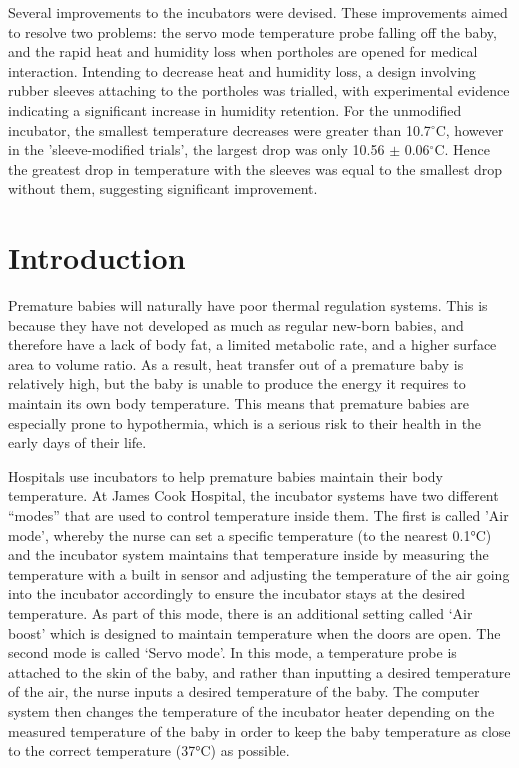 \documentclass{article}
\begin{document}
 \vspace{3mm}

Several improvements to the incubators were devised. These improvements aimed to resolve two problems: the servo mode temperature probe falling off the baby, and the rapid heat and humidity loss when portholes are opened for medical interaction. Intending to decrease heat and humidity loss, a design involving rubber sleeves attaching to the portholes was trialled, with experimental evidence indicating a significant increase in humidity retention. For the unmodified incubator, the smallest temperature decreases were greater than 10.7$^{\circ}$C, however in the 'sleeve-modified trials’, the largest drop was only 10.56 $\pm$ 0.06$^{\circ}$C. Hence the greatest drop in temperature with the sleeves was equal to the smallest drop without them, suggesting significant improvement. 

\section{Introduction}

Premature babies will naturally have poor thermal regulation systems. This is because they have not developed as much as regular new-born babies, and therefore have a lack of body fat, a limited metabolic rate, and a higher surface area to volume ratio. As a result, heat transfer out of a premature baby is relatively high, but the baby is unable to produce the energy it requires to maintain its own body temperature. This means that premature babies are especially prone to hypothermia, which is a serious risk to their health in the early days of their life. 

\vspace{3mm}

Hospitals use incubators to help premature babies maintain their body temperature. At James Cook Hospital, the incubator systems have two different “modes” that are used to control temperature inside them. The first is called 'Air mode', whereby the nurse can set a specific temperature (to the nearest 0.1°C) and the incubator system maintains that temperature inside by measuring the temperature with a built in sensor and adjusting the temperature of the air going into the incubator accordingly to ensure the incubator stays at the desired temperature. As part of this mode, there is an additional setting called ‘Air boost’ which is designed to maintain temperature when the doors are open. The second mode is called ‘Servo mode’. In this mode, a temperature probe is attached to the skin of the baby, and rather than inputting a desired temperature of the air, the nurse inputs a desired temperature of the baby. The computer system then changes the temperature of the incubator heater depending on the measured temperature of the baby in order to keep the baby temperature as close to the correct temperature (37°C) as possible. 
\end{document}
